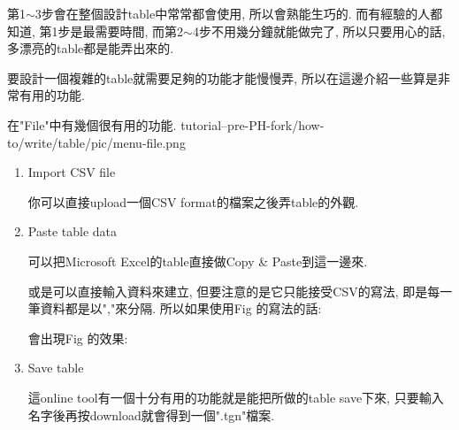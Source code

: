   第1$\sim$3步會在整個設計table中常常都會使用, 所以會熟能生巧的. 而有經驗的人都知道, 第1步是最需要時間, 而第2$\sim$4步不用幾分鐘就能做完了, 所以只要用心的話, 多漂亮的table都是能弄出來的.

\newpage
{}

要設計一個複雜的table就需要足夠的功能才能慢慢弄, 所以在這邊介紹一些算是非常有用的功能.


  在"File"中有幾個很有用的功能.
  \InsertFigure
    {tutorial--pre-PH-fork/how-to/write/table/pic/menu-file.png}

  \begin{enumerate}

  \item
  {
    Import CSV file

    你可以直接upload一個CSV format的檔案之後弄table的外觀.
  } %

  \newpage
  \item
  {
    Paste table data

    可以把Microsoft Excel的table直接做Copy \& Paste到這一邊來.

    或是可以直接輸入資料來建立, 但要注意的是它只能接受CSV的寫法, 即是每一筆資料都是以","來分隔. 所以如果使用Fig 的寫法的話:

    會出現Fig 的效果:

  } %

  \newpage
  \item
  {
    Save table

    這online tool有一個十分有用的功能就是能把所做的table save下來, 只要輸入名字後再按download就會得到一個".tgn"檔案.

}
\end{enumerate}
